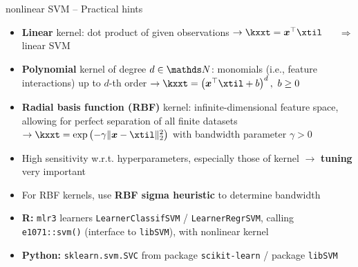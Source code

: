 \begin{frame}{nonlinear SVM -- Practical hints}

\footnotesize


\begin{itemize}
  \item \textbf{Linear} kernel: dot product of given observations $\rightarrow 
  \kxxt = \xv^\top \xtil$ ~~ $\Rightarrow$ linear SVM
  \item \textbf{Polynomial} kernel of degree $d \in \N$: monomials (i.e., 
  feature interactions) up to $d$-th 
  order $\rightarrow 
  \kxxt = \left(\xv^\top \xtil + b \right)^d, ~ b \geq 0$
  \item \textbf{Radial basis function (RBF)} kernel: infinite-dimensional 
  feature space, allowing for perfect separation of all finite 
  datasets $\rightarrow \kxxt = \exp \left( -\gamma \| \xv - \xtil \|_2^2 
  \right )$ with 
  bandwidth parameter $\gamma > 0$
\end{itemize}
 
\medskip

 
 \begin{itemize}
  \item High sensitivity w.r.t. hyperparameters, especially those of kernel
  $\rightarrow$ \textbf{tuning} very important
  \item For RBF kernels, use \textbf{RBF sigma heuristic} to determine 
  bandwidth
\end{itemize}

  \medskip

\begin{itemize}
  \item \textbf{R:} \texttt{mlr3} learners \texttt{LearnerClassifSVM} /
  \texttt{LearnerRegrSVM}, calling \texttt{e1071::svm()} (interface to 
  \texttt{libSVM}), with nonlinear kernel
  \item \textbf{Python:} \texttt{sklearn.svm.SVC} from package 
  \texttt{scikit-learn} / package \texttt{libSVM}
\end{itemize}

\end{frame}